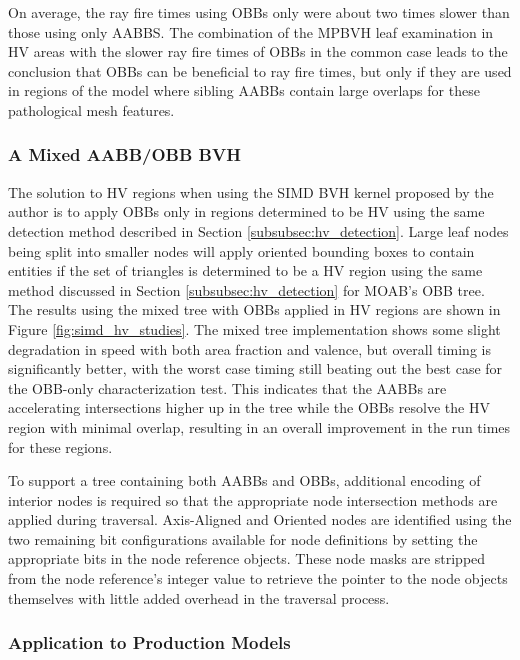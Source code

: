 On average, the ray fire times using OBBs only were about two times slower
than those using only AABBS. The combination of the MPBVH leaf
examination in HV areas with the slower ray fire times of OBBs in the
common case leads to the conclusion that OBBs can be beneficial to ray fire
times, but only if they are used in regions of the model where sibling
AABBs contain large overlaps for these pathological mesh features. 

\subsubsection{A Mixed AABB/OBB BVH}

The solution to HV regions when using the SIMD BVH
kernel proposed by the author is to apply OBBs only in regions determined to be
HV using the same detection method described in Section
\ref{subsubsec:hv_detection}. Large leaf nodes being split into smaller nodes
will apply oriented bounding boxes to contain entities if the set of triangles
is determined to be a HV region using the same method discussed in
Section \ref{subsubsec:hv_detection} for MOAB's OBB tree. The results using the mixed tree with
OBBs applied in HV regions are shown in Figure \ref{fig:simd_hv_studies}. The
mixed tree implementation shows some slight degradation in speed with both area
fraction and valence, but overall timing is significantly better, with the worst
case timing still beating out the best case for the OBB-only characterization
test. This indicates that the AABBs are accelerating intersections higher up in
the tree while the OBBs resolve the HV region with minimal overlap,
resulting in an overall improvement in the run times for these regions.

To support a tree containing both AABBs and OBBs, additional encoding of
interior nodes is required so that the appropriate node intersection methods are
applied during traversal. Axis-Aligned and Oriented nodes are identified using
the two remaining bit configurations available for node definitions by
setting the appropriate bits in the node reference objects. These node masks are
stripped from the node reference's integer value to retrieve the pointer to the
node objects themselves with little added overhead in the traversal process.

\subsubsection{Application to Production Models}

